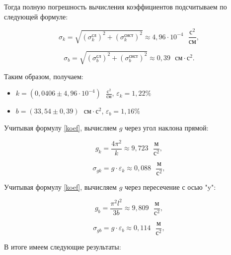 \documentclass[a4paper,12pt]{article}
\begin{document}
 	Тогда полную погрешность вычисления коэффициентов подсчитываем по следующей формуле:
 	
 	\begin{equation}
 		\sigma_k = \sqrt{\left( \sigma_k^\text{сл} \right)^2 + \left( \sigma_k^\text{сист} \right)^2 } \approx 4,96\cdot 10^{-4} \text{ }\frac{\text{с}^2}{\text{см}},
 	\end{equation}
 	
 	\begin{equation}
 		\sigma_b = \sqrt{\left( \sigma_b^\text{сл} \right)^2 + \left( \sigma_b^\text{сист} \right)^2 } \approx 0,39 \text{ }\text{см}\cdot\text{с}^2.
 	\end{equation}
 	
 	Таким образом, получаем:
 	\begin{itemize}
 		\item $ k = \left( 0,0406\pm 4,96\cdot10^{-4}\right)  \text{ }\frac{\text{с}^2}{\text{см}} $, $ \varepsilon_k = 1,22 \% $
 		\item $ b = \left( 33,54\pm 0,39 \right)  \text{ }\text{см}\cdot\text{с}^2 $, $ \varepsilon_b = 1,16 \% $
 	\end{itemize}
 	
 	Учитывая формулу \eqref{koef}, вычисляем $ g $ через угол наклона прямой:
 	
 	\begin{equation}
 		g_k = \frac{4\pi^2}{k} \approx 9,723  \text{ }\frac{\text{м}}{\text{с}^2},
 	\end{equation}
 	
 	\begin{equation}
 		\sigma_{gk} = g\cdot\varepsilon_k \approx 0,088 \text{ }\frac{\text{м}}{\text{с}^2},
 	\end{equation}
 	
 	
 	
 	Учитывая формулу \eqref{koef}, вычисляем $ g $ через пересечение с осью "y":
 	
 	\begin{equation}
 		g_b = \frac{\pi^2l^2}{3b} \approx 9,809  \text{ }\frac{\text{м}}{\text{с}^2},
 	\end{equation}
 	
 	\begin{equation}
 		\sigma_{gb} = g\cdot\varepsilon_b \approx 0,114 \text{ }\frac{\text{м}}{\text{с}^2},
 	\end{equation}
 	
 	
 	
 	В итоге имеем следующие результаты:
 	
\end{document}
